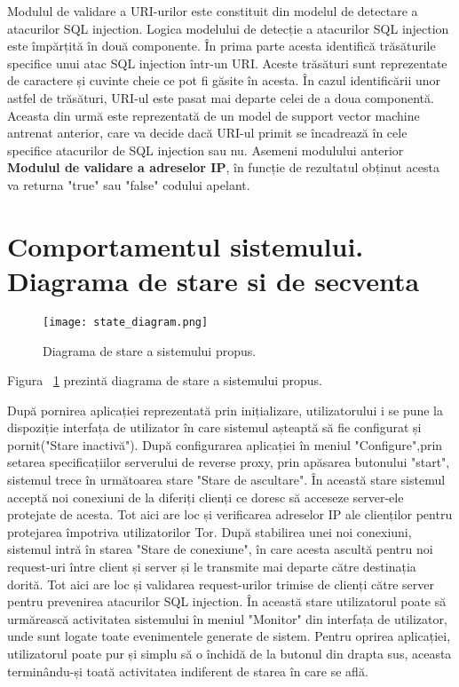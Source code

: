 Modulul de validare a URI-urilor este constituit din modelul de detectare a atacurilor SQL injection. Logica modelului de detecție a atacurilor SQL injection este împărțită în două componente. În prima parte acesta identifică trăsăturile specifice unui atac SQL injection într-un URI. Aceste trăsături sunt reprezentate de caractere și cuvinte cheie ce pot fi găsite în acesta. În cazul identificării unor astfel de trăsături, URI-ul este pasat mai departe celei de a doua componentă. Aceasta din urmă este reprezentată de un model de support vector machine antrenat anterior, care va decide dacă URI-ul primit se încadrează în cele specifice atacurilor de SQL injection sau nu. Asemeni modulului anterior \textbf{Modulul de validare a adreselor IP}, în funcție de rezultatul obținut acesta va returna "true" sau "false" codului apelant. 

\section{Comportamentul sistemului. Diagrama de stare si de secventa}
\begin{figure}[h]
	\centering
	\texttt{[image: state\_diagram.png]}
	\caption{Diagrama de stare a sistemului propus.}
	\label{fig:state}
\end{figure}
Figura ~\ref{fig:state} prezintă diagrama de stare a sistemului propus.

După pornirea aplicației reprezentată prin inițializare, utilizatorului i se pune la dispoziție interfața de utilizator în care sistemul așteaptă să fie configurat și pornit("Stare inactivă"). După configurarea aplicației în meniul "Configure",prin setarea specificațiilor serverului de reverse proxy, prin apăsarea butonului "start", sistemul trece în următoarea stare "Stare de ascultare". În această stare sistemul acceptă noi conexiuni de la diferiți clienți ce doresc să acceseze server-ele protejate de acesta. Tot aici are loc și verificarea adreselor IP ale clienților pentru protejarea împotriva utilizatorilor Tor. După stabilirea unei noi conexiuni, sistemul intră în starea "Stare de conexiune", în care acesta ascultă pentru noi request-uri între client și server și le transmite mai departe către destinația dorită. Tot aici are loc și validarea request-urilor trimise de clienți către server pentru prevenirea atacurilor SQL injection. În această stare utilizatorul poate să urmărească activitatea sistemului în meniul "Monitor" din interfața de utilizator, unde sunt logate toate evenimentele generate de sistem. Pentru oprirea aplicației, utilizatorul poate pur și simplu să o închidă de la butonul din drapta sus, aceasta terminându-și toată activitatea indiferent de starea în care se află. 


